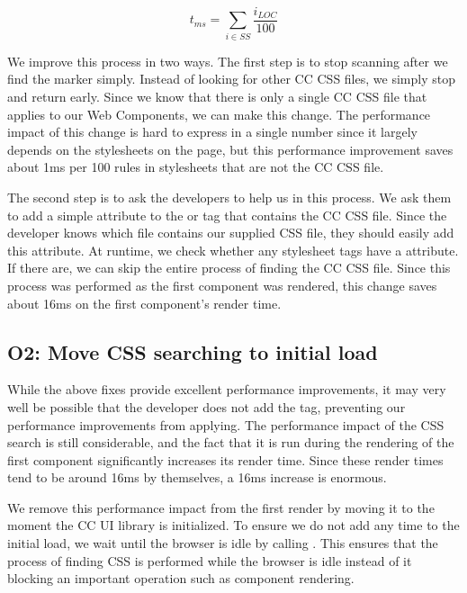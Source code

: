 \[ t_{ms} = \sum_{i \in SS} \frac{i_{LOC}}{100} \]

We improve this process in two ways. The first step is to stop scanning after we find the marker simply. Instead of looking for other CC CSS files, we simply stop and return early. Since we know that there is only a single CC CSS file that applies to our Web Components, we can make this change. The performance impact of this change is hard to express in a single number since it largely depends on the stylesheets on the page, but this performance improvement saves about 1ms per 100 rules in stylesheets that are not the CC CSS file.

The second step is to ask the developers to help us in this process. We ask them to add a simple  attribute to the  or  tag that contains the CC CSS file. Since the developer knows which file contains our supplied CSS file, they should easily add this attribute. At runtime, we check whether any stylesheet tags have a  attribute. If there are, we can skip the entire process of finding the CC CSS file. Since this process was performed as the first component was rendered, this change saves about 16ms on the first component's render time.

\subsection{O2: Move CSS searching to initial load}\label{sec:case-study:css-initial-load}
While the above fixes provide excellent performance improvements, it may very well be possible that the developer does not add the  tag, preventing our performance improvements from applying. The performance impact of the CSS search is still considerable, and the fact that it is run during the rendering of the first component significantly increases its render time. Since these render times tend to be around 16ms by themselves, a 16ms increase is enormous.

We remove this performance impact from the first render by moving it to the moment the CC UI library is initialized. To ensure we do not add any time to the initial load, we wait until the browser is idle by calling . This ensures that the process of finding CSS is performed while the browser is idle instead of it blocking an important operation such as component rendering.

